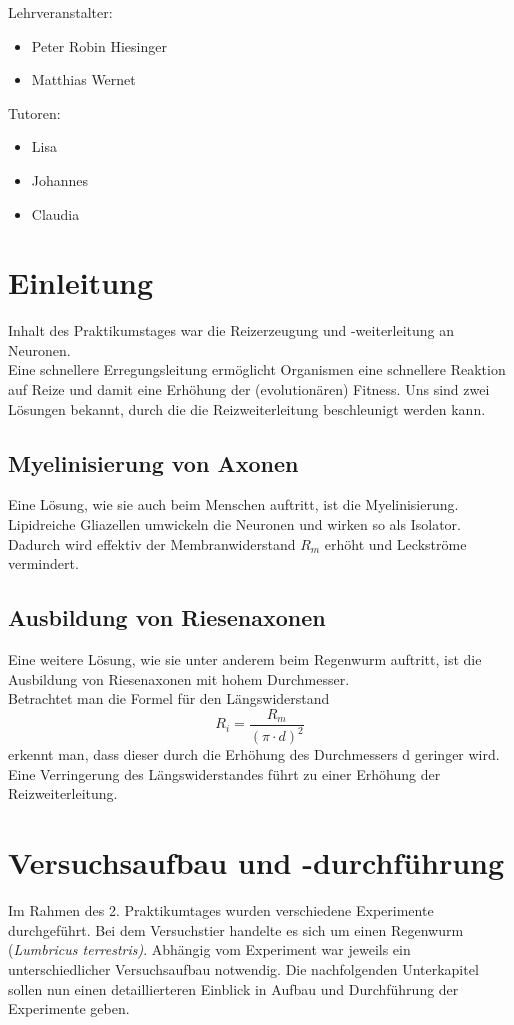 \documentclass[a4paper]{article}
\begin{document}
\begin{titlepage}
{\LARGE Lehrveranstalter:}
\begin{itemize}
\item  Peter Robin Hiesinger
\item Matthias Wernet
\end{itemize}
\vspace{2.5\baselineskip}

{\LARGE Tutoren:}
\begin{itemize}
\item Lisa
\item Johannes
\item Claudia
\end{itemize}
	
\end{titlepage}
\section{Einleitung}

Inhalt des Praktikumstages war die Reizerzeugung und -weiterleitung an Neuronen.\\
Eine schnellere Erregungsleitung ermöglicht Organismen eine schnellere Reaktion auf Reize und damit eine Erhöhung der (evolutionären) Fitness. Uns sind zwei Lösungen bekannt, durch die die Reizweiterleitung beschleunigt werden kann.
\subsection{Myelinisierung von Axonen}
Eine Lösung, wie sie auch beim Menschen auftritt, ist die Myelinisierung.
Lipidreiche Gliazellen umwickeln die Neuronen und wirken so als Isolator. Dadurch wird effektiv der Membranwiderstand \(R_m\) erhöht und Leckströme vermindert.\\
\subsection{Ausbildung von Riesenaxonen}
Eine weitere Lösung, wie sie unter anderem beim Regenwurm auftritt, ist die Ausbildung von Riesenaxonen mit hohem Durchmesser.\\
Betrachtet man die Formel für den Längswiderstand \[R_i = \frac{R_m}{(\pi \cdot d)^2}\] erkennt man, dass dieser durch die Erhöhung des Durchmessers d geringer wird. Eine Verringerung des Längswiderstandes führt zu einer Erhöhung der Reizweiterleitung.

\section{Versuchsaufbau und -durchführung}
Im Rahmen des 2. Praktikumtages wurden verschiedene Experimente durchgeführt. Bei dem Versuchstier handelte es sich um einen Regenwurm (\textit{Lumbricus terrestris)}. Abhängig vom Experiment war jeweils ein unterschiedlicher Versuchsaufbau notwendig. Die nachfolgenden Unterkapitel sollen nun einen detaillierteren Einblick in Aufbau und Durchführung der Experimente geben.
\end{document}
